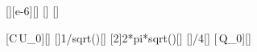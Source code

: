[\micro\farad][e-6][\farad]
[\volt]
[\henry]

[C\,U_0]{\CpX*\UzX}[\coulomb]
[]{1/sqrt(\LiX*\CpX)}[\radps]
[2\pi{}]{2*pi*sqrt(\LiX*\CpX)}[\second]
[]{\TX/4}[\second]
[\omega\,Q_0]{\omX*\QzX}[\ampere]

